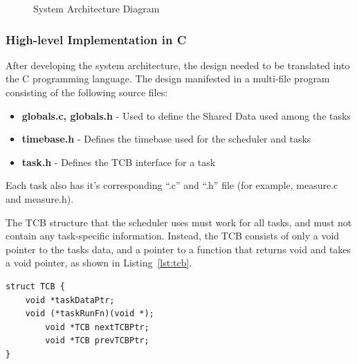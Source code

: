 \documentclass[12pt]{article} %
\begin{document}
    \begin{figure}[h]
      \centering
      \caption{System Architecture Diagram}
      \label{fig:arch}
    \end{figure}

    \subsubsection{High-level Implementation in C}
    After developing the system architecture, the design needed to be translated into the C programming language. The design manifested in a multi-file program consisting of the following source files:
    \begin{itemize}
      \item \textbf{globals.c, globals.h} - Used to define the Shared Data used among the tasks
      \item \textbf{timebase.h} - Defines the timebase used for the scheduler and tasks
      \item \textbf{task.h} - Defines the TCB interface for a task
    \end{itemize}
    Each task also has it's corresponding ``.c'' and ``.h'' file (for example, measure.c and measure.h).

    The TCB structure that the scheduler uses must work for all tasks, and must
    not contain any task-specific information. Instead, the TCB consists of
    only a void pointer to the tasks data, and a pointer to a function that
    returns void and takes a void pointer, as shown in Listing~\ref{lst:tcb}.
	
\begin{lstlisting}[caption=TCB Construct, captionpos=b, label=lst:tcb]
struct TCB {
    void *taskDataPtr;
    void (*taskRunFn)(void *);
		void *TCB nextTCBPtr;
		void *TCB prevTCBPtr;
}
\end{lstlisting}
\end{document}
